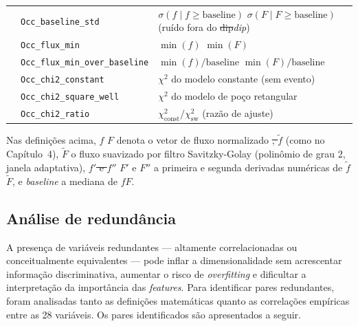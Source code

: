 \documentclass[msc]{on} %
\makeatletter
\providecommand{\DIFaddtex}[1]{{\protect\color{red}#1}} %
\providecommand{\DIFdeltex}[1]{{\protect\color{red}\sout{#1}}} %
\providecommand{\DIFaddbegin}{} %
\providecommand{\DIFaddend}{} %
\providecommand{\DIFdelbegin}{} %
\providecommand{\DIFdelend}{} %
\providecommand{\DIFaddFL}[1]{\DIFadd{#1}} %
\providecommand{\DIFdelFL}[1]{\DIFdel{#1}} %
\providecommand{\DIFaddbeginFL}{} %
\providecommand{\DIFaddendFL}{} %
\providecommand{\DIFdelbeginFL}{} %
\providecommand{\DIFdelendFL}{} %
\providecommand{\DIFadd}[1]{\texorpdfstring{\DIFaddtex{#1}}{#1}} %
\providecommand{\DIFdel}[1]{\texorpdfstring{\DIFdeltex{#1}}{}} %
\let\sout@orig\sout %
\renewcommand{\sout}[1]{\ifmmode\text{\sout@orig{\ensuremath{#1}}}\else\sout@orig{#1}\fi} %
\makeatother
\begin{document}
\begin{table}[htbp]
\begin{tabular}{llp{7.5cm}}
& \texttt{Occ\_baseline\_std} & \DIFdelbeginFL \DIFdelFL{$\sigma(f \mid f \ge \text{baseline})$ }\DIFdelendFL \DIFaddbeginFL \DIFaddFL{$\sigma(F \mid F \ge \text{baseline})$ }\DIFaddendFL (ruído fora do \DIFdelbeginFL \DIFdelFL{dip}\DIFdelendFL \DIFaddbeginFL \textit{\DIFaddFL{dip}}\DIFaddendFL ) \\
& \texttt{Occ\_flux\_min} & \DIFdelbeginFL \DIFdelFL{$\min(f)$ }\DIFdelendFL \DIFaddbeginFL \DIFaddFL{$\min(F)$ }\DIFaddendFL \\
& \texttt{Occ\_flux\_min\_over\_baseline} & \DIFdelbeginFL \DIFdelFL{$\min(f)/\text{baseline}$ }\DIFdelendFL \DIFaddbeginFL \DIFaddFL{$\min(F)/\text{baseline}$ }\DIFaddendFL \\
& \texttt{Occ\_chi2\_constant} & $\chi^2$ do modelo constante (sem evento) \\
& \texttt{Occ\_chi2\_square\_well} & $\chi^2$ do modelo de poço retangular \\
& \texttt{Occ\_chi2\_ratio} & $\chi^2_{\text{const}}/\chi^2_{\text{sw}}$ (razão de ajuste) \\
\hline
\end{tabular}
\end{table}

Nas definições acima, \DIFdelbegin \DIFdel{$f$ }\DIFdelend \DIFaddbegin \DIFadd{$F$ }\DIFaddend denota o vetor de fluxo normalizado \DIFdelbegin \DIFdel{, $\tilde{f}$ }\DIFdelend \DIFaddbegin \DIFadd{(como no Capítulo~4), $\tilde{F}$ }\DIFaddend o fluxo suavizado por filtro Savitzky-Golay (polinômio de grau 2, janela adaptativa), \DIFdelbegin \DIFdel{$f'$ e $f''$ }\DIFdelend \DIFaddbegin \DIFadd{$F'$ e $F''$ }\DIFaddend a primeira e segunda derivadas numéricas de \DIFdelbegin \DIFdel{$\tilde{f}$}\DIFdelend \DIFaddbegin \DIFadd{$\tilde{F}$}\DIFaddend , e \emph{baseline} a mediana de \DIFdelbegin \DIFdel{$f$}\DIFdelend \DIFaddbegin \DIFadd{$F$}\DIFaddend .

\subsection{Análise de redundância}

A presença de variáveis redundantes --- altamente correlacionadas ou conceitualmente equivalentes --- pode inflar a dimensionalidade sem acrescentar informação discriminativa, aumentar o risco de \textit{overfitting} e dificultar a interpretação da importância das \textit{features}. Para identificar pares redundantes, foram analisadas tanto as definições matemáticas quanto as correlações empíricas entre as 28 variáveis. Os pares identificados são apresentados a seguir.
\end{document}
